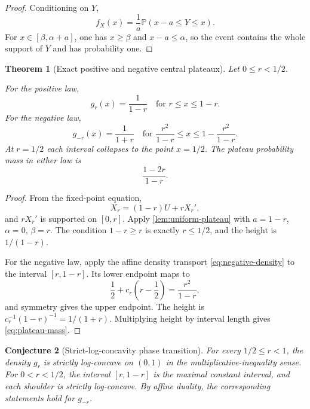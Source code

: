 \documentclass[11pt]{article}
\newtheorem{theorem}{Theorem}[section]
\newtheorem{conjecture}[theorem]{Conjecture}
\theoremstyle{definition}
\newcommand{\Pp}{\mathbb P}
\begin{document}
\begin{proof}
Conditioning on \(Y\),
\[
 f_X(x)=\frac1a\Pp(x-a\le Y\le x).
\]
For \(x\in[\beta,\alpha+a]\), one has \(x\ge\beta\) and \(x-a\le\alpha\), so the event
contains the whole support of \(Y\) and has probability one.
\end{proof}

\begin{theorem}[Exact positive and negative central plateaux]\label{thm:geometric-plateau}
Let \(0\le r<1/2\).

For the positive law,
\begin{equation}
 \boxed{
 g_r(x)=\frac1{1-r}\quad\text{for }r\le x\le1-r.}         \label{eq:positive-plateau}
\end{equation}
For the negative law,
\begin{equation}
 \boxed{
 g_{-r}(x)=\frac1{1+r}\quad\text{for }
 \frac{r^2}{1-r}\le x\le1-\frac{r^2}{1-r}.}              \label{eq:negative-plateau}
\end{equation}
At \(r=1/2\) each interval collapses to the point \(x=1/2\).  The plateau probability
mass in either law is
\begin{equation}
 \frac{1-2r}{1-r}.                                        \label{eq:plateau-mass}
\end{equation}
\end{theorem}

\begin{proof}
From the fixed-point equation,
\[
 X_r=(1-r)U+rX_r',
\]
and \(rX_r'\) is supported on \([0,r]\).  Apply
\cref{lem:uniform-plateau} with \(a=1-r\), \(\alpha=0\), \(\beta=r\).  The condition
\(1-r\ge r\) is exactly \(r\le1/2\), and the height is \(1/(1-r)\).

For the negative law, apply the affine density transport \cref{eq:negative-density} to
the interval \([r,1-r]\).  Its lower endpoint maps to
\[
 \frac12+c_r\left(r-\frac12\right)=\frac{r^2}{1-r},
\]
and symmetry gives the upper endpoint.  The height is
\(c_r^{-1}(1-r)^{-1}=1/(1+r)\).  Multiplying height by interval length gives
\cref{eq:plateau-mass}.
\end{proof}

\begin{conjecture}[Strict-log-concavity phase transition]\label{conj:strict-logconcavity}
For every \(1/2\le r<1\), the density \(g_r\) is strictly log-concave on \((0,1)\) in
the multiplicative-inequality sense.  For \(0<r<1/2\), the interval
\([r,1-r]\) is the maximal constant interval, and each shoulder is strictly
log-concave.  By affine duality, the corresponding statements hold for \(g_{-r}\).
\end{conjecture}
\end{document}
